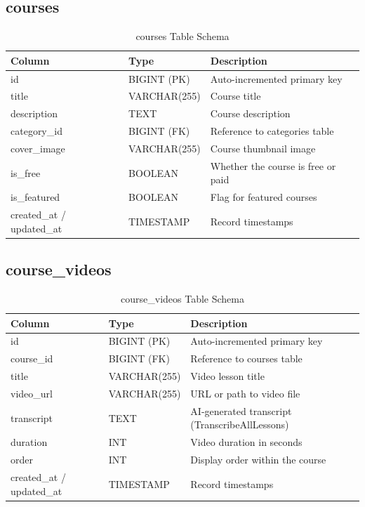 \subsection{courses}

\begin{table}[H]
\centering
\caption{courses Table Schema}
\begin{tabularx}{\textwidth}{|l|l|X|}
\hline
\textbf{Column} & \textbf{Type} & \textbf{Description} \\
\hline
id             & BIGINT (PK)   & Auto-incremented primary key \\
\hline
title          & VARCHAR(255)  & Course title \\
\hline
description    & TEXT          & Course description \\
\hline
category\_id   & BIGINT (FK)   & Reference to categories table \\
\hline
cover\_image   & VARCHAR(255)  & Course thumbnail image \\
\hline
is\_free       & BOOLEAN       & Whether the course is free or paid \\
\hline
is\_featured   & BOOLEAN       & Flag for featured courses \\
\hline
created\_at / updated\_at & TIMESTAMP & Record timestamps \\
\hline
\end{tabularx}
\end{table}

\subsection{course\_videos}

\begin{table}[H]
\centering
\caption{course\_videos Table Schema}
\begin{tabularx}{\textwidth}{|l|l|X|}
\hline
\textbf{Column} & \textbf{Type} & \textbf{Description} \\
\hline
id          & BIGINT (PK)   & Auto-incremented primary key \\
\hline
course\_id  & BIGINT (FK)   & Reference to courses table \\
\hline
title       & VARCHAR(255)  & Video lesson title \\
\hline
video\_url  & VARCHAR(255)  & URL or path to video file \\
\hline
transcript  & TEXT          & AI-generated transcript (TranscribeAllLessons) \\
\hline
duration    & INT           & Video duration in seconds \\
\hline
order       & INT           & Display order within the course \\
\hline
created\_at / updated\_at & TIMESTAMP & Record timestamps \\
\hline
\end{tabularx}
\end{table}

